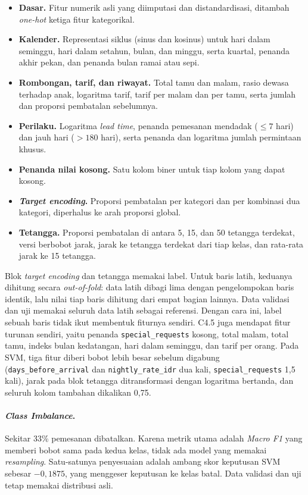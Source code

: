 \begin{itemize}
    \item \textbf{Dasar.} Fitur numerik asli yang diimputasi dan distandardisasi,
        ditambah \textit{one-hot} ketiga fitur kategorikal.
    \item \textbf{Kalender.} Representasi siklus (sinus dan kosinus) untuk hari
        dalam seminggu, hari dalam setahun, bulan, dan minggu, serta kuartal,
        penanda akhir pekan, dan penanda bulan ramai atau sepi.
    \item \textbf{Rombongan, tarif, dan riwayat.} Total tamu dan malam, rasio
        dewasa terhadap anak, logaritma tarif, tarif per malam dan per tamu,
        serta jumlah dan proporsi pembatalan sebelumnya.
    \item \textbf{Perilaku.} Logaritma \textit{lead time}, penanda pemesanan
        mendadak ($\le7$ hari) dan jauh hari ($>180$ hari), serta penanda dan
        logaritma jumlah permintaan khusus.
    \item \textbf{Penanda nilai kosong.} Satu kolom biner untuk tiap kolom yang
        dapat kosong.
    \item \textbf{\textit{Target encoding}.} Proporsi pembatalan per kategori
        dan per kombinasi dua kategori, diperhalus ke arah proporsi global.
    \item \textbf{Tetangga.} Proporsi pembatalan di antara 5, 15, dan 50
        tetangga terdekat, versi berbobot jarak, jarak ke tetangga terdekat dari
        tiap kelas, dan rata-rata jarak ke 15 tetangga.
\end{itemize}

Blok \textit{target encoding} dan tetangga memakai label. Untuk baris latih,
keduanya dihitung secara \textit{out-of-fold}: data latih dibagi lima
dengan pengelompokan baris identik, lalu nilai tiap baris dihitung dari empat
bagian lainnya. Data validasi dan uji memakai seluruh data latih sebagai
referensi. Dengan cara ini, label sebuah baris tidak ikut membentuk fiturnya
sendiri. C4.5 juga mendapat fitur turunan sendiri, yaitu penanda
\texttt{special\_requests} kosong, total malam, total tamu, indeks bulan
kedatangan, hari dalam seminggu, dan tarif per orang. Pada SVM, tiga fitur
diberi bobot lebih besar sebelum digabung (\texttt{days\_before\_arrival} dan
\texttt{nightly\_rate\_idr} dua kali, \texttt{special\_requests} 1,5 kali),
jarak pada blok tetangga ditransformasi dengan logaritma bertanda, dan
seluruh kolom tambahan dikalikan 0,75.

\paragraph{\textit{Class Imbalance}.} Sekitar 33\% pemesanan dibatalkan. Karena
metrik utama adalah \textit{Macro F1} yang memberi bobot sama pada kedua kelas,
tidak ada model yang memakai \textit{resampling}. Satu-satunya penyesuaian
adalah ambang skor keputusan SVM sebesar $-0{,}1875$, yang menggeser
keputusan ke kelas batal. Data validasi dan uji tetap memakai distribusi
asli.

